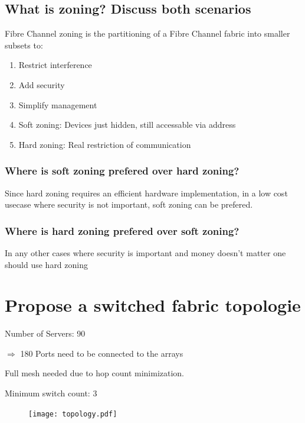 \documentclass{article}
\begin{document}
\subsection{ What is zoning? Discuss both scenarios}
	Fibre Channel zoning is the partitioning of a Fibre Channel fabric into smaller subsets to: \\
	\begin{enumerate}
		\item Restrict interference
		\item Add security  
		\item Simplify management
		\item Soft zoning: Devices just hidden, still accessable via address
		\item Hard zoning: Real restriction of communication 
	\end{enumerate}
	
	\subsubsection{ Where is soft zoning prefered over hard zoning?}
		Since hard zoning requires an efficient hardware implementation, in a low cost usecase where security is not important, soft zoning can be prefered.

	\subsubsection{ Where is hard zoning prefered over soft zoning?}
		In any other cases where security is important and money doesn't matter one should use hard zoning
		
\section{Propose a switched fabric topologie}
\begin{description} 
	\item Number of Servers: 90 \\
	\item $\Rightarrow$ 180 Ports need to be connected to the arrays
	\item Full mesh needed due to hop count minimization.
	\item Minimum switch count: 3
\end{description}
\begin{figure}[h]
	\texttt{[image: topology.pdf]}
	\end{figure}
\end{document}
